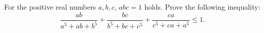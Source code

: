 For the positive real numbers $a,b,c$, $abc=1$ holds. Prove the following inequality:
$$\frac{ab}{a^5+ab+b^5}+\frac{bc}{b^5+bc+c^5}+\frac{ca}{c^5+ca+a^5} \leq 1.$$